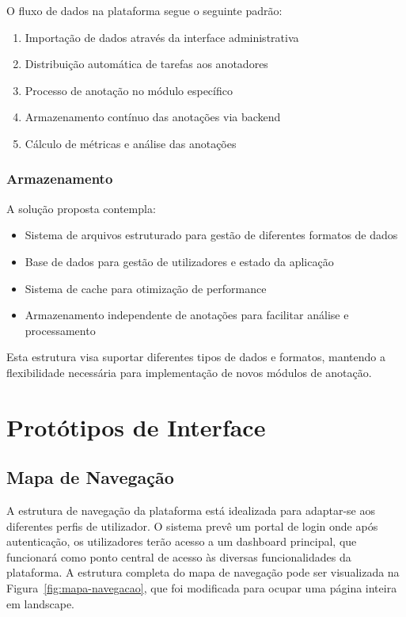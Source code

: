 O fluxo de dados na plataforma segue o seguinte padrão:
\begin{enumerate}
    \item Importação de dados através da interface administrativa
    \item Distribuição automática de tarefas aos anotadores
    \item Processo de anotação no módulo específico
    \item Armazenamento contínuo das anotações via backend
    \item Cálculo de métricas e análise das anotações
\end{enumerate}

\subsubsection{Armazenamento}

A solução proposta contempla:
\begin{itemize}
    \item Sistema de arquivos estruturado para gestão de diferentes formatos de dados
    \item Base de dados para gestão de utilizadores e estado da aplicação
    \item Sistema de cache para otimização de performance
    \item Armazenamento independente de anotações para facilitar análise e processamento
\end{itemize}

Esta estrutura visa suportar diferentes tipos de dados e formatos, mantendo a flexibilidade necessária para implementação de novos módulos de anotação.

\section{Protótipos de Interface}

\subsection{Mapa de Navegação}

A estrutura de navegação da plataforma está idealizada para adaptar-se aos diferentes perfis de utilizador. O sistema prevê um portal de login onde após autenticação, os utilizadores terão acesso a um dashboard principal, que funcionará como ponto central de acesso às diversas funcionalidades da plataforma. A estrutura completa do mapa de navegação pode ser visualizada na Figura~\ref{fig:mapa-navegacao}, que foi modificada para ocupar uma página inteira em landscape.


